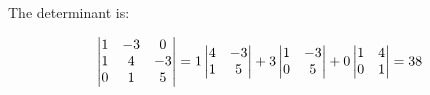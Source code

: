 \documentclass[12pt,a4paper]{report}
\begin{document}
The determinant is:

\begin{align}
\begin{vmatrix}
   1 & -3 &  0 \\
   1 &  4 & -3 \\
   0 &  1 &  5  \notag
\end{vmatrix}
=
1
 \begin{vmatrix}
4 & -3 \\ 
1 & 5 
\end{vmatrix}
+
3
 \begin{vmatrix}
1 & -3 \\ 
0 & 5 
\end{vmatrix}
+
0
 \begin{vmatrix}
1 & 4 \\ 
0 & 1 
\end{vmatrix}
=38\notag
\end{align}
\end{document}
